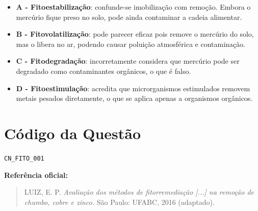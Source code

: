 \documentclass{article}
\begin{document}
\begin{itemize}
  \item\textbf{A - Fitoestabilização}: confunde-se imobilização com remoção. Embora o mercúrio fique preso no solo, pode ainda contaminar a cadeia alimentar.
  \item\textbf{B - Fitovolatilização}: pode parecer eficaz pois remove o mercúrio do solo, mas o libera no ar, podendo causar poluição atmosférica e contaminação.
  \item\textbf{C - Fitodegradação}: incorretamente considera que mercúrio pode ser degradado como contaminantes orgânicos, o que é falso.
  \item\textbf{D - Fitoestimulação}: acredita que microrganismos estimulados removem metais pesados diretamente, o que se aplica apenas a organismos orgânicos.
\end{itemize}

\section*{Código da Questão}

\texttt{CN\_FITO\_001}

\bigskip

\textbf{Referência oficial:}
\begin{quote}
LUIZ, E. P. \textit{Avaliação dos métodos de fitorremediação [...] na remoção de chumbo, cobre e zinco.} São Paulo: UFABC, 2016 (adaptado).
\end{quote}
\end{document}

